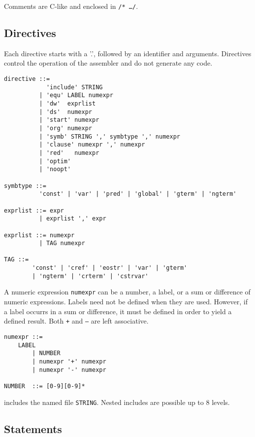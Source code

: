 Comments are C-like and enclosed in {\tt /* \ldots */}.

\subsection{Directives}
Each directive starts with a '.', followed by an identifier and
arguments. Directives control the operation of the assembler and do
not generate any code.

\begin{verbatim}
directive ::=
            'include' STRING
          | 'equ' LABEL numexpr
          | 'dw'  exprlist
          | 'ds'  numexpr
          | 'start' numexpr
          | 'org' numexpr
          | 'symb' STRING ',' symbtype ',' numexpr
          | 'clause' numexpr ',' numexpr
          | 'red'   numexpr
          | 'optim'
          | 'noopt'

symbtype ::=
          'const' | 'var' | 'pred' | 'global' | 'gterm' | 'ngterm'

exprlist ::= expr
          | exprlist ',' expr

exprlist ::= numexpr
          | TAG numexpr

TAG ::=
        'const' | 'cref' | 'eostr' | 'var' | 'gterm'
        | 'ngterm' | 'crterm' | 'cstrvar'
\end{verbatim}

A numeric expression {\tt numexpr} can be a number, a label, or a
sum or difference of numeric expressions. Labels need not be defined
when they are used. However, if a label occurrs in a sum or difference,
it must be defined in order to yield a defined result.
Both {\tt +} and {\tt --} are left associative.

\begin{verbatim}
numexpr ::=
	LABEL
        | NUMBER
        | numexpr '+' numexpr
        | numexpr '-' numexpr

NUMBER  ::= [0-9][0-9]*
\end{verbatim}

includes the named file {\tt STRING}. Nested includes are possible up
to 8 levels.


\subsection{Statements}


